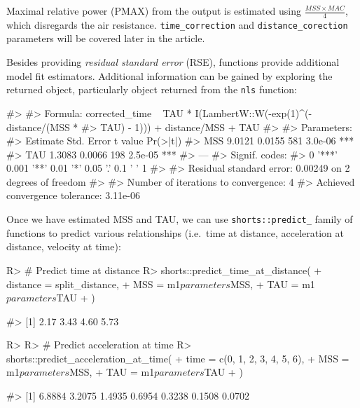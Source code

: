 \documentclass[
]{jss}
\begin{document}
Maximal relative power (PMAX) from the output is estimated using \(\frac{MSS \times MAC}{4}\), which disregards the air resistance. \texttt{time\_correction} and \texttt{distance\_corection} parameters will be covered later in the article.

Besides providing \emph{residual standard error} (RSE),  functions provide additional model fit estimators. Additional information can be gained by exploring the returned object, particularly object returned from the \texttt{nls} function:

\begin{CodeChunk}
\begin{CodeOutput}
#> 
#> Formula: corrected_time ~ TAU * I(LambertW::W(-exp(1)^(-distance/(MSS * 
#>     TAU) - 1))) + distance/MSS + TAU
#> 
#> Parameters:
#>     Estimate Std. Error t value Pr(>|t|)    
#> MSS   9.0121     0.0155     581  3.0e-06 ***
#> TAU   1.3083     0.0066     198  2.5e-05 ***
#> ---
#> Signif. codes:  
#> 0 '***' 0.001 '**' 0.01 '*' 0.05 '.' 0.1 ' ' 1
#> 
#> Residual standard error: 0.00249 on 2 degrees of freedom
#> 
#> Number of iterations to convergence: 4 
#> Achieved convergence tolerance: 3.11e-06
\end{CodeOutput}
\end{CodeChunk}

Once we have estimated MSS and TAU, we can use \texttt{shorts::predict\_} family of functions to predict various relationships (i.e.~time at distance, acceleration at distance, velocity at time):

\begin{CodeChunk}
\begin{CodeInput}
R> # Predict time at distance
R> shorts::predict_time_at_distance(
+   distance = split_distance,
+   MSS = m1$parameters$MSS,
+   TAU = m1$parameters$TAU
+ )
\end{CodeInput}
\begin{CodeOutput}
#> [1] 2.17 3.43 4.60 5.73
\end{CodeOutput}
\begin{CodeInput}
R> 
R> # Predict acceleration at time
R> shorts::predict_acceleration_at_time(
+   time = c(0, 1, 2, 3, 4, 5, 6),
+   MSS = m1$parameters$MSS,
+   TAU = m1$parameters$TAU
+ )
\end{CodeInput}
\begin{CodeOutput}
#> [1] 6.8884 3.2075 1.4935 0.6954 0.3238 0.1508 0.0702
\end{CodeOutput}
\end{CodeChunk}
\end{document}
